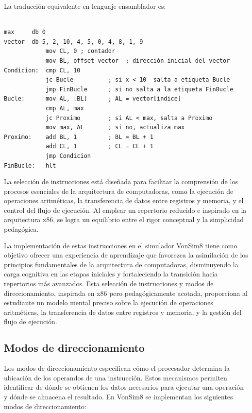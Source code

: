 \documentclass[12pt,oneside]{templates/unerthesis}
\begin{document}
La traducción equivalente en lenguaje ensamblador es:

\begin{lstlisting}[breaklines=true]

max     db 0
vector  db 5, 2, 10, 4, 5, 0, 4, 8, 1, 9
            mov CL, 0 ; contador
            mov BL, offset vector  ; dirección inicial del vector
Condicion:  cmp CL, 10 
            jc Bucle          ; si x < 10  salta a etiqueta Bucle
            jmp FinBucle      ; si no salta a la etiqueta FinBucle
Bucle:      mov AL, [BL]      ; AL = vector[indice] 
            cmp AL, max
            jc Proximo        ; si AL < max, salta a Proximo
            mov max, AL       ; si no, actualiza max
Proximo:    add BL, 1         ; BL = BL + 1 
            add CL, 1         ; CL = CL + 1            
            jmp Condicion 
FinBucle:   hlt
\end{lstlisting}

La selección de instrucciones está diseñada para facilitar la comprensión de los procesos esenciales de la arquitectura de computadoras, como la ejecución de operaciones aritméticas, la transferencia de datos entre registros y memoria, y el control del flujo de ejecución. Al emplear un repertorio reducido e inspirado en la arquitectura x86, se logra un equilibrio entre el rigor conceptual y la simplicidad pedagógica.

La implementación de estas instrucciones en el simulador VonSim8 tiene como objetivo ofrecer una experiencia de aprendizaje que favorezca la asimilación de los principios fundamentales de la arquitectura de computadoras, disminuyendo la carga cognitiva en las etapas iniciales y fortaleciendo la transición hacia repertorios más avanzados. Esta selección de instrucciones y modos de direccionamiento, inspirada en x86 pero pedagógicamente acotada, proporciona al estudiante un modelo mental preciso sobre la ejecución de operaciones aritméticas, la transferencia de datos entre registros y memoria, y la gestión del flujo de ejecución.

\hypertarget{modos-de-direccionamiento-1}{%
\subsection{Modos de direccionamiento}\label{modos-de-direccionamiento-1}}

Los modos de direccionamiento especifican cómo el procesador determina la ubicación de los operandos de una instrucción. Estos mecanismos permiten identificar de dónde se obtienen los datos necesarios para ejecutar una operación y dónde se almacena el resultado. En VonSim8 se implementan los siguientes modos de direccionamiento:
\end{document}
